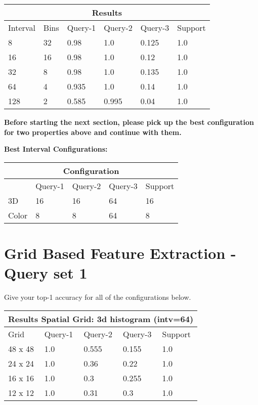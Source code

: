 \documentclass[12pt]{article}
\begin{document}
\begin{tabular}{ |p{1.5cm}|p{1.5cm}||p{2cm}|p{2cm}|p{2cm}|p{2cm}|  }
    \hline
    \multicolumn{6}{|c|}{Results} \\
    \hline
    Interval & Bins & Query-1 & Query-2 & Query-3 & Support \\
    \hline
    8 & 32 & 0.98 & 1.0 & 0.125 & 1.0 \\
    \hline
    16 & 16 & 0.98 & 1.0 & 0.12 & 1.0 \\
    \hline
    32 & 8 & 0.98 & 1.0 & 0.135 & 1.0 \\
    \hline
    64 & 4 & 0.935 & 1.0 & 0.14 & 1.0 \\
    \hline
    128 & 2 & 0.585 & 0.995 & 0.04 & 1.0 \\
    \hline
\end{tabular}

\vspace{1cm}


\newpage
\textbf{Before starting the next section, please pick up the best configuration for two properties above and continue with them.}

\vspace*{0.5cm}
\textbf{Best Interval Configurations:}

\begin{tabular}{ |p{1.5cm}||p{2cm}|p{2cm}|p{2cm}|p{2cm}|  }
    \hline
    \multicolumn{5}{|c|}{Configuration} \\
    \hline
     & Query-1 & Query-2 & Query-3 & Support \\
    \hline
    3D & 16 & 16 &  64  & 16 \\
    \hline
    Color & 8 & 8 & 64  & 8 \\
    \hline
\end{tabular}

\section{Grid Based Feature Extraction - Query set 1}
Give your top-1 accuracy for all of the configurations below.


\vspace*{0.5cm}
\begin{tabular}{ |p{1.5cm}||p{2cm}|p{2cm}|p{2cm}|p{2cm}|  }
    \hline
    \multicolumn{5}{|c|}{Results Spatial Grid: 3d histogram (intv=64)} \\
    \hline
    Grid & Query-1 & Query-2 & Query-3 & Support \\
    \hline
    48 x 48 & 1.0 & 0.555 & 0.155 & 1.0 \\
    \hline
    24 x 24 & 1.0 & 0.36 & 0.22 & 1.0 \\
    \hline
    16 x 16 & 1.0 & 0.3 & 0.255 & 1.0 \\
    \hline
    12 x 12 & 1.0 & 0.31 & 0.3 & 1.0 \\
    \hline
\end{tabular}
\end{document}
